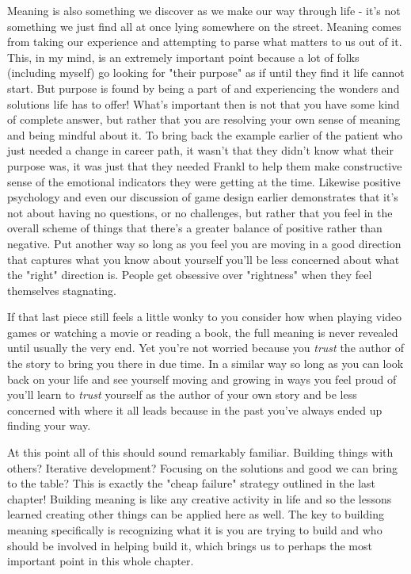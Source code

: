 \documentclass[11pt,a5paper]{book}
\begin{document}
Meaning is also something we discover as we make our way through life - it's not something we just find all at once lying somewhere on the street. Meaning comes from taking our experience and attempting to parse what matters to us out of it. This, in my mind, is an extremely important point because a lot of folks (including myself) go looking for "their purpose" as if until they find it life cannot start. But purpose is found by being a part of and experiencing the wonders and solutions life has to offer! What's important then is not that you have some kind of complete answer, but rather that you are resolving your own sense of meaning and being mindful about it. To bring back the example earlier of the patient who just needed a change in career path, it wasn't that they didn't know what their purpose was, it was just that they needed Frankl to help them make constructive sense of the emotional indicators they were getting at the time. Likewise positive psychology and even our discussion of game design earlier demonstrates that it's not about having no questions, or no challenges, but rather that you feel in the overall scheme of things that there's a greater balance of positive rather than negative. Put another way so long as you feel you are moving in a good direction that captures what you know about yourself you'll be less concerned about what the "right" direction is. People get obsessive over "rightness" when they feel themselves stagnating.
\newline

If that last piece still feels a little wonky to you consider how when playing video games or watching a movie or reading a book, the full meaning is never revealed until usually the very end. Yet you're not worried because you \textit{trust} the author of the story to bring you there in due time. In a similar way so long as you can look back on your life and see yourself moving and growing in ways you feel proud of you'll learn to \textit{trust} yourself as the author of your own story and be less concerned with where it all leads because in the past you've always ended up finding your way. 
\newline

At this point all of this should sound remarkably familiar. Building things with others? Iterative development? Focusing on the solutions and good we can bring to the table? This is exactly the "cheap failure" strategy outlined in the last chapter! Building meaning is like any creative activity in life and so the lessons learned creating other things can be applied here as well. The key to building meaning specifically is recognizing what it is you are trying to build and who should be involved in helping build it, which brings us to perhaps the most important point in this whole chapter.
\end{document}
